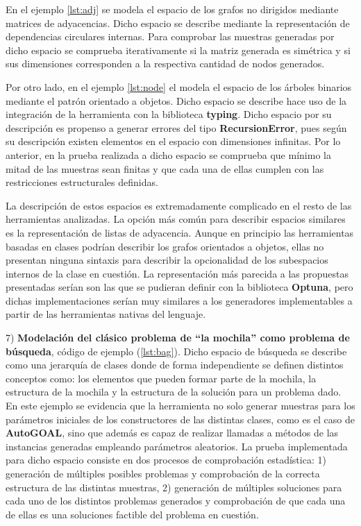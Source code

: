 En el ejemplo \ref{lst:adj} se modela el espacio de los grafos no dirigidos mediante matrices de adyacencias. Dicho espacio
se describe mediante la representación de dependencias circulares internas. Para comprobar las muestras
generadas por dicho espacio se comprueba iterativamente si la matriz generada es simétrica y si sus dimensiones corresponden a
la respectiva cantidad de nodos generados. 

Por otro lado, en el ejemplo \ref{lst:node} el modela el espacio de los árboles binarios mediante el patrón orientado a objetos.
Dicho espacio se describe hace uso de la integración de la herramienta con la biblioteca {\bf typing}. 
Dicho espacio por su descripción es propenso a generar errores del tipo {\bf RecursionError},
pues según su descripción existen elementos en el espacio con dimensiones infinitas. Por lo anterior, en la prueba realizada a
dicho espacio se comprueba que mínimo la mitad de las muestras sean finitas y que cada una de ellas cumplen con las
restricciones estructurales definidas.

La descripción de estos espacios es extremadamente complicado en el resto de las herramientas analizadas. La opción más común
para describir espacios similares es la representación de listas de adyacencia. Aunque en principio las herramientas basadas
en clases podrían describir los grafos orientados a objetos, ellas no presentan ninguna sintaxis para describir la opcionalidad
de los subespacios internos de la clase en cuestión. La representación más parecida a las propuestas presentadas serían son las que se pudieran
definir con la biblioteca {\bf Optuna}, pero dichas implementaciones serían muy similares a los generadores implementables a partir
de las herramientas nativas del lenguaje.

7) {\bf Modelación del clásico problema de ``la mochila'' como problema de búsqueda}, código de ejemplo (\ref{lst:bag}). Dicho espacio de búsqueda se describe como una
jerarquía de clases donde de forma independiente se definen distintos conceptos como: los elementos que pueden formar parte de
la mochila, la estructura de la mochila y la estructura de la solución para un problema dado. En este ejemplo se evidencia que la
herramienta no solo generar muestras para los parámetros iniciales de los constructores de las distintas clases, como es el caso de
      {\bf AutoGOAL}, sino que además es capaz de realizar llamadas a métodos de las instancias generadas empleando parámetros aleatorios. La
prueba implementada para dicho espacio consiste en dos procesos de comprobación estadística: 1) generación de múltiples posibles
problemas y comprobación de la correcta estructura de las distintas muestras, 2) generación de múltiples soluciones para cada uno
de los distintos problemas generados y comprobación de que cada una de ellas es una  soluciones factible del problema en cuestión.

